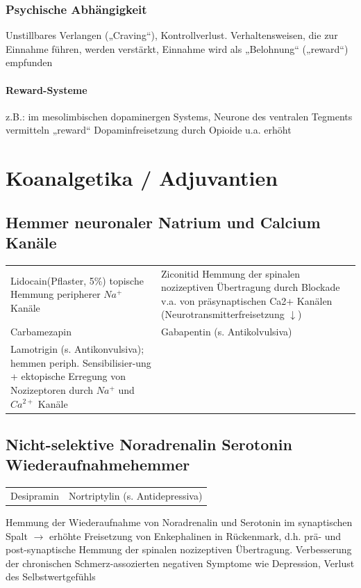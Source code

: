 \documentclass[10pt,a4paper]{report}
\begin{document}
\subsubsection{Psychische Abhängigkeit} %
\label{par:psychische_abh_ngigkeit}
Unstillbares Verlangen („Craving“), Kontrollverlust. Verhaltensweisen, die zur Einnahme führen, werden verstärkt, Einnahme wird als „Belohnung“ („reward“) empfunden
\paragraph{Reward-Systeme} %
\label{subp:reward_systeme}
z.B.: im mesolimbischen dopaminergen Systems, Neurone des ventralen Tegments vermitteln „reward“ Dopaminfreisetzung durch Opioide u.a. erhöht
\section{Koanalgetika / Adjuvantien} %
\label{sec:koanalgetika_adjuvantien}
\subsection{Hemmer neuronaler Natrium und Calcium Kanäle} %
\begin{tabularx}{\textwidth}{XX}
Lidocain(Pflaster, 5\%)  topische Hemmung peripherer $Na^+$ Kanäle&Ziconitid Hemmung der spinalen nozizeptiven Übertragung durch Blockade v.a. von präsynaptischen  Ca2+ Kanälen (Neurotransmitterfreisetzung $\downarrow$)\\
Carbamezapin&Gabapentin (s. Antikolvulsiva)\\
Lamotrigin (s. Antikonvulsiva); hemmen periph. Sensibilisier-ung + ektopische Erregung von Nozizeptoren durch $Na^+$ und $Ca^{2+}$ Kanäle\\
\end{tabularx}
\subsection{Nicht-selektive Noradrenalin Serotonin Wiederaufnahmehemmer    } %
\label{sub:nicht_selektive_noradrenalin_serotonin_wiederaufnahmehemmer_}
\begin{tabularx}{\textwidth}{XX}
Desipramin&Nortriptylin (s. Antidepressiva)\\
\end{tabularx}
Hemmung der Wiederaufnahme von Noradrenalin und Serotonin im synaptischen Spalt $\rightarrow$ erhöhte Freisetzung von Enkephalinen in Rückenmark, d.h. prä- und post-synaptische Hemmung der spinalen nozizeptiven Übertragung. Verbesserung der chronischen Schmerz-assozierten negativen Symptome wie Depression, Verlust des Selbstwertgefühls
\end{document}
